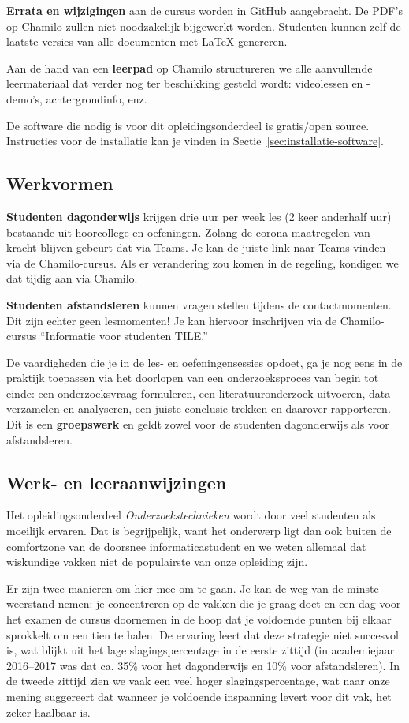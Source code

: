 \textbf{Errata en wijzigingen} aan de cursus worden in GitHub aangebracht. De PDF's op Chamilo zullen niet noodzakelijk bijgewerkt worden. Studenten kunnen zelf de laatste versies van alle documenten met \LaTeX{} genereren.

Aan de hand van een \textbf{leerpad} op Chamilo structureren we alle aanvullende leermateriaal dat verder nog ter beschikking gesteld wordt: videolessen en -demo's, achtergrondinfo, enz.

De software die nodig is voor dit opleidingsonderdeel is gratis/open source. Instructies voor de installatie kan je vinden in Sectie~\ref{sec:installatie-software}.

\subsection{Werkvormen}

\textbf{Studenten dagonderwijs} krijgen drie uur per week les (2 keer anderhalf uur) bestaande uit hoorcollege en oefeningen. Zolang de corona-maatregelen van kracht blijven gebeurt dat via Teams. Je kan de juiste link naar Teams vinden via de Chamilo-cursus. Als er verandering zou komen in de regeling, kondigen we dat tijdig aan via Chamilo.

\textbf{Studenten afstandsleren} kunnen vragen stellen tijdens de contactmomenten. Dit zijn echter geen lesmomenten! Je kan hiervoor inschrijven via de Chamilo-cursus ``Informatie voor studenten TILE.''

De vaardigheden die je in de les- en oefeningensessies opdoet, ga je nog eens in de praktijk toepassen via het doorlopen van een onderzoeksproces van begin tot einde: een onderzoeksvraag formuleren, een literatuuronderzoek uitvoeren, data verzamelen en analyseren, een juiste conclusie trekken en daarover rapporteren. Dit is een \textbf{groepswerk} en geldt zowel voor de studenten dagonderwijs als voor afstandsleren.

\subsection{Werk- en leeraanwijzingen}

Het opleidingsonderdeel \emph{Onderzoekstechnieken} wordt door veel studenten als moeilijk ervaren. Dat is begrijpelijk, want het onderwerp ligt dan ook buiten de comfortzone van de doorsnee informaticastudent en we weten allemaal dat wiskundige vakken niet de populairste van onze opleiding zijn.

Er zijn twee manieren om hier mee om te gaan. Je kan de weg van de minste weerstand nemen: je concentreren op de vakken die je graag doet en een dag voor het examen de cursus doornemen in de hoop dat je voldoende punten bij elkaar sprokkelt om een tien te halen. De ervaring leert dat deze strategie niet succesvol is, wat blijkt uit het lage slagingspercentage in de eerste zittijd (in academiejaar 2016--2017 was dat ca. 35\% voor het dagonderwijs en 10\% voor afstandsleren). In de tweede zittijd zien we vaak een veel hoger slagingspercentage, wat naar onze mening suggereert dat wanneer je voldoende inspanning levert voor dit vak, het zeker haalbaar is.

